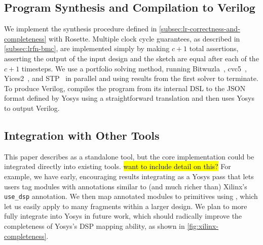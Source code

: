 

\subsection{Program Synthesis and Compilation to Verilog}
\label{sec:implementation:program-synthesis}

We implement
  the synthesis procedure
  defined in \cref{subsec:lr-correctness-and-completeness}
  with Rosette.
Multiple clock cycle guarantees,
  as described in \cref{subsec:lrfn-bmc},
  are implemented simply by making $c+1$
  total assertions,
  asserting the output of the input design
  and the sketch are equal
  after each of the $c+1$ timesteps.
We use a portfolio solving
  method, running
  Bitwuzla~\cite{niemetz2020bitwuzla},
  cvc5~\cite{barbosa2022cvc5},
  Yices2~\cite{dutertre2006yices,dutertre2014yices},
  and STP~\cite{stp}
  in parallel
  and using results from the first
  solver to terminate.
To produce Verilog,
  \lr compiles the program from its internal DSL
  to the JSON format defined
  by Yosys using a straightforward translation 
  and then uses Yosys to output Verilog.


\subsection{Integration with Other Tools}

This paper describes \lr
  as a standalone tool,
  but the core \lr implementation
  could be integrated directly into
  existing tools.
\hl{want to include detail on this?}
For example,
  we have early,
  encouraging results
  integrating \lr
  as a Yosys pass
  that lets users tag modules
  with annotations similar to 
  (and much richer than) Xilinx's
  \texttt{use\_dsp} annotation.
We then map annotated modules 
  to primitives using \lr,
  which let us easily apply \lr to
  many fragments within a larger design.
We plan to more fully
  integrate \lr into Yosys in future work,
  which should radically improve the completeness
  of Yosys's DSP mapping ability,
  as shown in \cref{fig:xilinx-completeness}.
